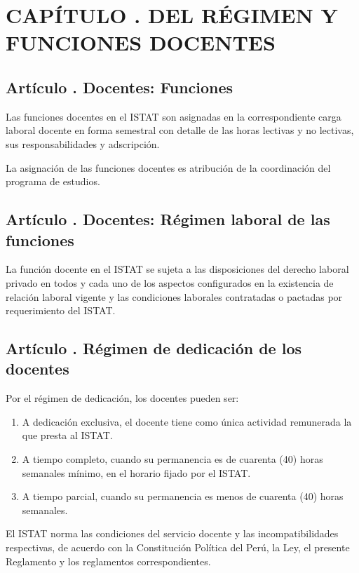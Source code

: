 \section{CAPÍTULO . DEL RÉGIMEN Y FUNCIONES DOCENTES }
\addtocounter{re}{1}

\subsection{Artículo . Docentes: Funciones}
\addtocounter{ns}{1}
Las funciones docentes en el ISTAT son asignadas en la correspondiente carga laboral docente en forma semestral con detalle de las horas lectivas y no lectivas, sus responsabilidades y adscripción.  

La asignación de las funciones docentes es atribución de la coordinación del programa de estudios. 
\subsection{Artículo . Docentes: Régimen laboral de las funciones}
\addtocounter{ns}{1}
La función docente en el ISTAT se sujeta a las disposiciones del derecho laboral privado en todos y cada uno de los aspectos configurados en la existencia de relación laboral vigente y las condiciones laborales contratadas o pactadas por requerimiento del ISTAT. 
\subsection{Artículo . Régimen de dedicación de los docentes}
\addtocounter{ns}{1}
Por el régimen de dedicación, los docentes pueden ser: 
\begin{enumerate}
\item A dedicación exclusiva, el docente tiene como única actividad remunerada la que presta al ISTAT. 
\item A tiempo completo, cuando su permanencia es de cuarenta (40) horas semanales mínimo, en el horario fijado por el ISTAT. 
\item A tiempo parcial, cuando su permanencia es menos de cuarenta (40) horas semanales. 
\end{enumerate}
El ISTAT norma las condiciones del servicio docente y las incompatibilidades respectivas, de acuerdo con la Constitución Política del Perú, la Ley, el presente Reglamento y los reglamentos correspondientes. 
